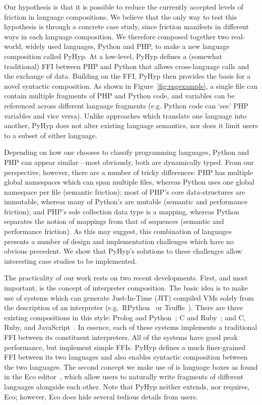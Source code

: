 \documentclass[a4paper,UKenglish]{lipics-v2016}
\newcommand{\ourvm}{PyHyp\xspace}
\begin{document}
Our hypothesis is that it is possible to reduce the currently accepted levels of
friction in language compositions. We believe that the only way to test this
hypothesis is through a concrete case study, since friction manifests in different
ways in each language composition. We therefore composed together two
real-world, widely used languages, Python and PHP, to make a new language
composition called \ourvm. At a low-level, \ourvm defines a
(somewhat traditional) FFI between PHP and Python that allows cross-language
calls and the exchange of data. Building on the FFI, \ourvm then provides the
basis for a novel syntactic composition. As shown in
Figure~\ref{fig:rngexample}, a single file can contain multiple fragments of PHP
and Python code, and variables can be
referenced across different language fragments (e.g. Python code can `see' PHP
variables and vice versa). Unlike approaches which translate
one language into another, \ourvm does not alter existing
language semantics, nor does it limit users to a subset of either language.

Depending on how one chooses to classify programming languages, Python and PHP
can appear similar---most obviously, both are dynamically typed. From our
perspective, however, there are a number of tricky differences: PHP has multiple
global namespaces which can span multiple files, whereas Python uses one global
namespace per file (semantic friction); most of PHP's core data-structures are
immutable, whereas many of Python's are mutable (semantic and performance friction); and
PHP's sole collection data type is a mapping, whereas Python separates the
notion of mappings from that of sequences (semantic and performance friction).
As this may suggest, this combination of languages presents a number of
design and implementation challenges which have no obvious precedent.
We show that \ourvm's solutions to these challenges allow
interesting case studies to be implemented.

The practicality of our work rests on two recent developments.
First, and most important, is the concept of interpreter
composition. The basic idea is to make use of systems which can
generate Just-In-Time (JIT) compiled VMs solely from the description of an interpreter
(e.g.~RPython~\cite{bolz14impact} or Truffle~\cite{wuerthinger13onevm}). There
are three existing compositions in this style: Prolog and Python~\cite{barrett15approaches};
C and Ruby~\cite{grimmer2014dynamically}; and C, Ruby, and JavaScript~\cite{grimmer15interop}.
In essence, each of these systems implements a
traditional FFI between its constituent interpreters. All of the systems have good peak
performance, but implement simple FFIs. \ourvm
defines a much finer-grained FFI between its two languages and also enables
syntactic composition between the two languages. The second concept we make use of is
language boxes as found in the Eco
editor~\cite{diekmann14eco}, which allow users to naturally write fragments
of different languages alongside each other. Note that \ourvm neither
extends, nor requires, Eco; however, Eco does hide several tedious details
from users.
\end{document}
